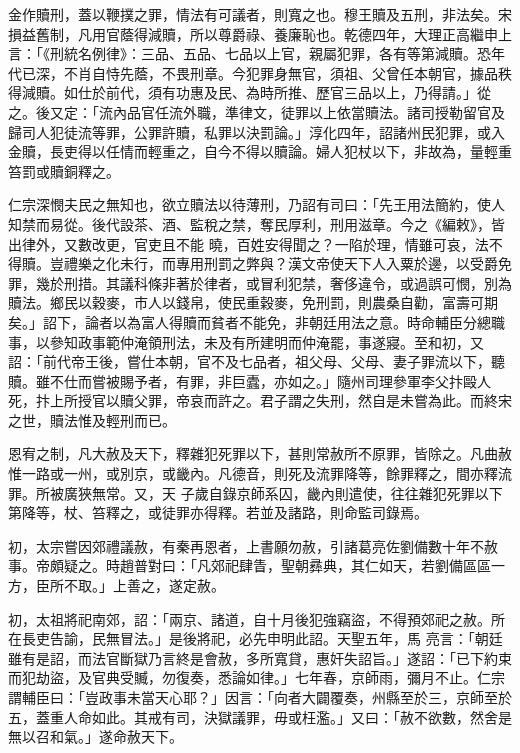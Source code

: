 \begin{pinyinscope}
 金作贖刑，蓋以鞭撲之罪，情法有可議者，則寬之也。穆王贖及五刑，非法矣。宋損益舊制，凡用官蔭得減贖，所以尊爵祿、養廉恥也。乾德四年，大理正高繼申上言：「《刑統名例律》：三品、五品、七品以上官，親屬犯罪，各有等第減贖。恐年代已深，不肖自恃先蔭，不畏刑章。今犯罪身無官，須祖、父曾任本朝官，據品秩得減贖。如仕於前代，須有功惠及民、為時所推、歷官三品以上，乃得請。」從
 之。後又定：「流內品官任流外職，準律文，徒罪以上依當贖法。諸司授勒留官及歸司人犯徒流等罪，公罪許贖，私罪以決罰論。」淳化四年，詔諸州民犯罪，或入金贖，長吏得以任情而輕重之，自今不得以贖論。婦人犯杖以下，非故為，量輕重笞罰或贖銅釋之。



 仁宗深憫夫民之無知也，欲立贖法以待薄刑，乃詔有司曰：「先王用法簡約，使人知禁而易從。後代設茶、酒、監稅之禁，奪民厚利，刑用滋章。今之《編敕》，皆出律外，又數改更，官吏且不能
 曉，百姓安得聞之？一陷於理，情雖可哀，法不得贖。豈禮樂之化未行，而專用刑罰之弊與？漢文帝使天下人入粟於邊，以受爵免罪，幾於刑措。其議科條非著於律者，或冒利犯禁，奢侈違令，或過誤可憫，別為贖法。鄉民以穀麥，市人以錢帛，使民重穀麥，免刑罰，則農桑自勸，富壽可期矣。」詔下，論者以為富人得贖而貧者不能免，非朝廷用法之意。時命輔臣分總職事，以參知政事範仲淹領刑法，未及有所建明而仲淹罷，事遂寢。至和初，又
 詔：「前代帝王後，嘗仕本朝，官不及七品者，祖父母、父母、妻子罪流以下，聽贖。雖不仕而嘗被賜予者，有罪，非巨蠹，亦如之。」隨州司理參軍李父抃毆人死，抃上所授官以贖父罪，帝哀而許之。君子謂之失刑，然自是未嘗為此。而終宋之世，贖法惟及輕刑而已。



 恩宥之制，凡大赦及天下，釋雜犯死罪以下，甚則常赦所不原罪，皆除之。凡曲赦惟一路或一州，或別京，或畿內。凡德音，則死及流罪降等，餘罪釋之，間亦釋流罪。所被廣狹無常。又，天
 子歲自錄京師系囚，畿內則遣使，往往雜犯死罪以下第降等，杖、笞釋之，或徒罪亦得釋。若並及諸路，則命監司錄焉。



 初，太宗嘗因郊禮議赦，有秦再恩者，上書願勿赦，引諸葛亮佐劉備數十年不赦事。帝頗疑之。時趙普對曰：「凡郊祀肆眚，聖朝彞典，其仁如天，若劉備區區一方，臣所不取。」上善之，遂定赦。



 初，太祖將祀南郊，詔：「兩京、諸道，自十月後犯強竊盜，不得預郊祀之赦。所在長吏告諭，民無冒法。」是後將祀，必先申明此詔。天聖五年，馬
 亮言：「朝廷雖有是詔，而法官斷獄乃言終是會赦，多所寬貸，惠奸失詔旨。」遂詔：「已下約束而犯劫盜，及官典受贓，勿復奏，悉論如律。」七年春，京師雨，彌月不止。仁宗謂輔臣曰：「豈政事未當天心耶？」因言：「向者大闢覆奏，州縣至於三，京師至於五，蓋重人命如此。其戒有司，決獄議罪，毋或枉濫。」又曰：「赦不欲數，然舍是無以召和氣。」遂命赦天下。




\end{pinyinscope}
